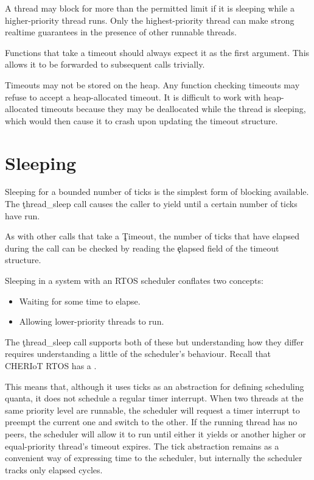 \begin{note}
A thread may block for more than the permitted limit if it is sleeping while a higher-priority thread runs.
Only the highest-priority thread can make strong realtime guarantees in the presence of other runnable threads.
\end{note}

Functions that take a timeout should always expect it as the first argument.
This allows it to be forwarded to subsequent calls trivially.

\begin{warning}
Timeouts may not be stored on the heap.
Any function checking timeouts may refuse to accept a heap-allocated timeout.
It is difficult to work with heap-allocated timeouts because they may be deallocated while the thread is sleeping, which would then cause it to crash upon updating the timeout structure.
\end{warning}

\section{Sleeping}

Sleeping for a bounded number of ticks is the simplest form of blocking available.
The \c{thread_sleep} call causes the caller to yield until a certain number of ticks have run.


As with other calls that take a \c{Timeout}, the number of ticks that have elapsed during the call can be checked by reading the \c{elapsed} field of the timeout structure.

Sleeping in a system with an RTOS scheduler conflates two concepts:

\begin{itemize}
	\item{Waiting for some time to elapse.}
	\item{Allowing lower-priority threads to run.}
\end{itemize}

The \c{thread_sleep} call supports both of these but understanding how they differ requires understanding a little of the scheduler's behaviour.
Recall that CHERIoT RTOS has a .

This means that, although it uses ticks as an abstraction for defining scheduling quanta, it does not schedule a regular timer interrupt.
When two threads at the same priority level are runnable, the scheduler will request a timer interrupt to preempt the current one and switch to the other.
If the running thread has no peers, the scheduler will allow it to run until either it yields or another higher or equal-priority thread's timeout expires.
The tick abstraction remains as a convenient way of expressing time to the scheduler, but internally the scheduler tracks only elapsed cycles.

